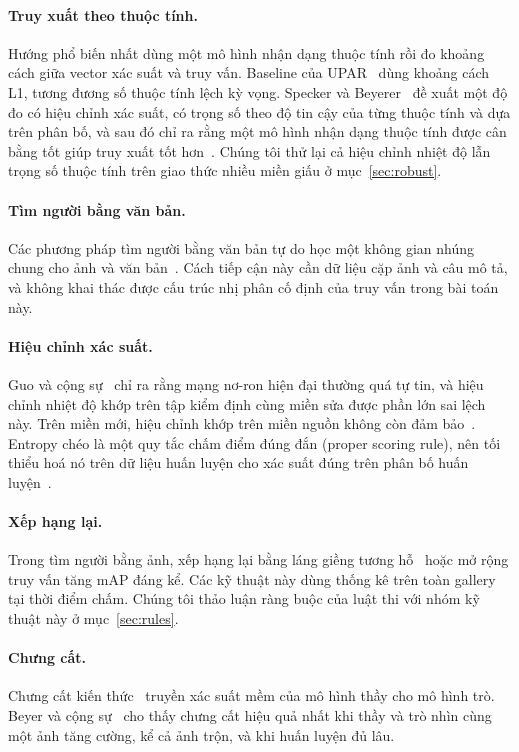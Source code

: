 \documentclass[11pt,a4paper]{article}
\begin{document}
\paragraph{Truy xuất theo thuộc tính.} Hướng phổ biến nhất dùng một mô hình nhận dạng thuộc tính rồi đo khoảng cách giữa vector xác suất và truy vấn. Baseline của UPAR~\cite{upar} dùng khoảng cách L1, tương đương số thuộc tính lệch kỳ vọng. Specker và Beyerer~\cite{specker21} đề xuất một độ đo có hiệu chỉnh xác suất, có trọng số theo độ tin cậy của từng thuộc tính và dựa trên phân bố, và sau đó chỉ ra rằng một mô hình nhận dạng thuộc tính được cân bằng tốt giúp truy xuất tốt hơn~\cite{specker23}. Chúng tôi thử lại cả hiệu chỉnh nhiệt độ lẫn trọng số thuộc tính trên giao thức nhiều miền giấu ở mục~\ref{sec:robust}.

\paragraph{Tìm người bằng văn bản.} Các phương pháp tìm người bằng văn bản tự do học một không gian nhúng chung cho ảnh và văn bản~\cite{cuhkpedes}. Cách tiếp cận này cần dữ liệu cặp ảnh và câu mô tả, và không khai thác được cấu trúc nhị phân cố định của truy vấn trong bài toán này.

\paragraph{Hiệu chỉnh xác suất.} Guo và cộng sự~\cite{guo} chỉ ra rằng mạng nơ-ron hiện đại thường quá tự tin, và hiệu chỉnh nhiệt độ khớp trên tập kiểm định cùng miền sửa được phần lớn sai lệch này. Trên miền mới, hiệu chỉnh khớp trên miền nguồn không còn đảm bảo~\cite{ovadia}. Entropy chéo là một quy tắc chấm điểm đúng đắn (proper scoring rule), nên tối thiểu hoá nó trên dữ liệu huấn luyện cho xác suất đúng trên phân bố huấn luyện~\cite{gneiting}.

\paragraph{Xếp hạng lại.} Trong tìm người bằng ảnh, xếp hạng lại bằng láng giềng tương hỗ~\cite{kreciprocal} hoặc mở rộng truy vấn tăng mAP đáng kể. Các kỹ thuật này dùng thống kê trên toàn gallery tại thời điểm chấm. Chúng tôi thảo luận ràng buộc của luật thi với nhóm kỹ thuật này ở mục~\ref{sec:rules}.

\paragraph{Chưng cất.} Chưng cất kiến thức~\cite{hinton} truyền xác suất mềm của mô hình thầy cho mô hình trò. Beyer và cộng sự~\cite{patient} cho thấy chưng cất hiệu quả nhất khi thầy và trò nhìn cùng một ảnh tăng cường, kể cả ảnh trộn, và khi huấn luyện đủ lâu.
\end{document}
